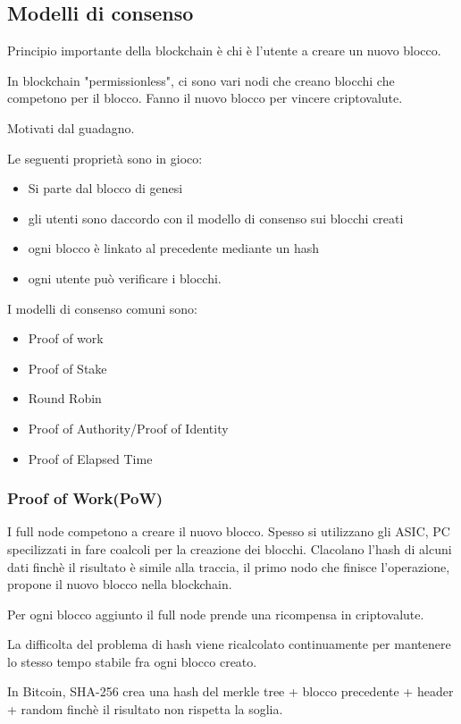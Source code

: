 \subsection{Modelli di consenso}
Principio importante della blockchain è chi è l'utente a creare un nuovo blocco.

In blockchain "permissionless", ci sono vari nodi che creano blocchi che competono per il blocco.
Fanno il nuovo blocco per vincere criptovalute.

Motivati dal guadagno.


Le seguenti proprietà sono in gioco:
\begin{itemize}
    \item Si parte dal blocco di genesi
    \item gli utenti sono daccordo con il modello di consenso sui blocchi creati
    \item ogni blocco è linkato al precedente mediante un hash
    \item ogni utente può verificare i blocchi.
\end{itemize}

I modelli di consenso comuni sono:
\begin{itemize}
    \item Proof of work
    \item Proof of Stake
    \item Round Robin
    \item Proof of Authority/Proof of Identity
    \item Proof of Elapsed Time
\end{itemize}

\subsubsection{Proof of Work(PoW)}
I full node competono a creare il nuovo blocco.
Spesso si utilizzano gli ASIC, PC specilizzati in fare coalcoli per la creazione dei blocchi.
Clacolano l'hash di alcuni dati finchè il risultato è simile alla traccia, il primo nodo che finisce l'operazione, propone il nuovo blocco nella blockchain.

Per ogni blocco aggiunto il full node prende una ricompensa in criptovalute.

La difficolta del problema di hash viene ricalcolato continuamente per mantenere lo stesso tempo stabile fra ogni blocco creato.


In Bitcoin, SHA-256 crea una hash del merkle tree + blocco precedente + header + random finchè il risultato non rispetta la soglia.

